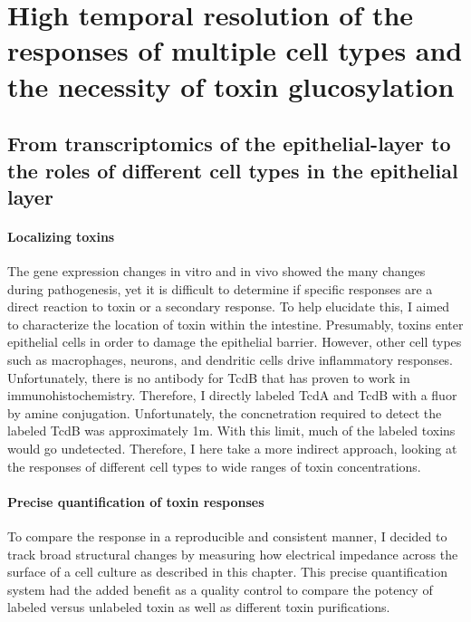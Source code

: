 \doublespacing

\chapter[Responses of multiple cell types]{ High temporal resolution 
           of the responses of multiple cell 
           types and the necessity of toxin glucosylation }


\section{From transcriptomics of the epithelial-layer to the roles
           of different cell types in the epithelial layer}

\subsubsection{Localizing toxins}
The gene expression changes in vitro and in vivo showed
the many changes during pathogenesis, yet it is difficult
to determine if specific responses are a direct
reaction to toxin or a secondary response.
To help elucidate this, I aimed to characterize the location
of toxin within the intestine.
Presumably, toxins enter
epithelial cells in order to damage the epithelial barrier.
However, other cell types such as macrophages, neurons, and dendritic cells
drive inflammatory responses. Unfortunately, there is no
antibody for TcdB that has proven to work in immunohistochemistry.
Therefore, I directly labeled TcdA and TcdB with a fluor by amine conjugation.
Unfortunately, the concnetration required to detect the labeled TcdB
was approximately 1\textmugreek{}m. With this limit, much
of the labeled toxins would go undetected. Therefore, I here take
a more indirect approach, looking at the responses of different cell
types to wide ranges of toxin concentrations.

\subsubsection{Precise quantification of toxin responses}
To compare the response in a reproducible and consistent manner,
I decided to track broad structural changes by measuring how electrical
impedance across the surface of a cell culture as described in this chapter.
This precise quantification system had the added benefit as a
quality control to compare the potency of labeled versus unlabeled toxin
as well as different toxin purifications.

